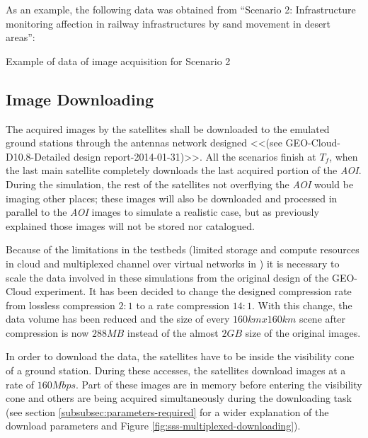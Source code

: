 As an example, the following data was obtained from ``Scenario 2: Infrastructure monitoring affection in railway infrastructures by sand movement in desert areas'':

\begin{table}[hp]
  \centering
  {\small
  
  }
  \caption{Example of data of image acquisition for Scenario 2}
  \label{table:sss-acquisitions-scenario2}
\end{table}


\subsection{Image Downloading}
\label{subsec:image-downloading}

The acquired images by the satellites shall be downloaded to the emulated ground
stations through the antennas network designed <<(see GEO-Cloud-D10.8-Detailed
design report-2014-01-31)>>. All the scenarios finish at $T_f$, when the last
main satellite completely downloads the last acquired portion of the
\emph{AOI}. During the simulation, the rest of the satellites not overflying the
\emph{AOI} would be imaging other places; these images will also be downloaded
and processed in parallel to the \emph{AOI} images to simulate a realistic case,
but as previously explained those images will not be stored nor catalogued.

Because of the limitations in the testbeds (limited storage and compute
resources in \bonfire cloud and multiplexed channel over virtual networks in
\vw) it is necessary to scale the data involved in these simulations from the
original design of the GEO-Cloud experiment. It has been decided to change the
designed compression rate from lossless compression $2:1$ to a rate compression
$14:1$. With this change, the data volume has been reduced and the size of every
$160km x 160km$ scene after compression is now $288MB$ instead of the almost
$2GB$ size of the original images.

In order to download the data, the satellites have to be inside the visibility
cone of a ground station. During these accesses, the satellites download images
at a rate of $160Mbps$. Part of these images are in memory before entering the
visibility cone and others are being acquired simultaneously during the
downloading task (see section \ref{subsubsec:parameters-required} for a wider explanation of the download parameters and Figure \ref{fig:sss-multiplexed-downloading}).

